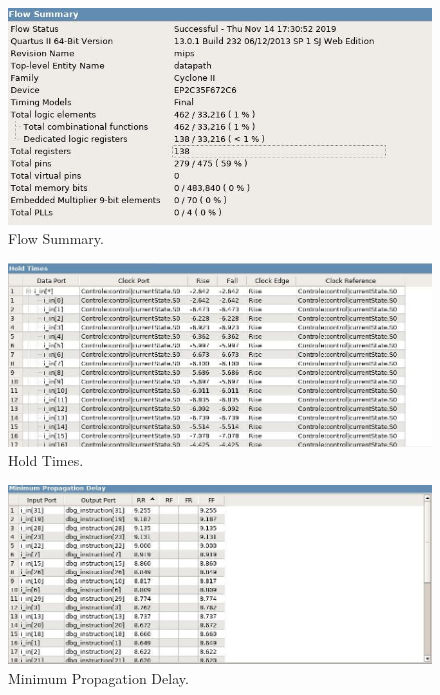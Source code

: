 \documentclass{article}
\begin{document}
        \begin{figure}[H]
            \centering
            \includegraphics[width=\textwidth]{flow_summary.jpg}
            \caption{Flow Summary.}
            \label{figura:mips}
        \end{figure}

        \begin{figure}[H]
            \centering
            \includegraphics[width=\textwidth]{hold_times.jpg}
            \caption{Hold Times.}
            \label{figura:mips}
        \end{figure}

        \begin{figure}[H]
            \centering
            \includegraphics[width=\textwidth]{minimum_propagation_delay.jpg}
            \caption{Minimum Propagation Delay.}
            \label{figura:mips}
        \end{figure}
\end{document}
